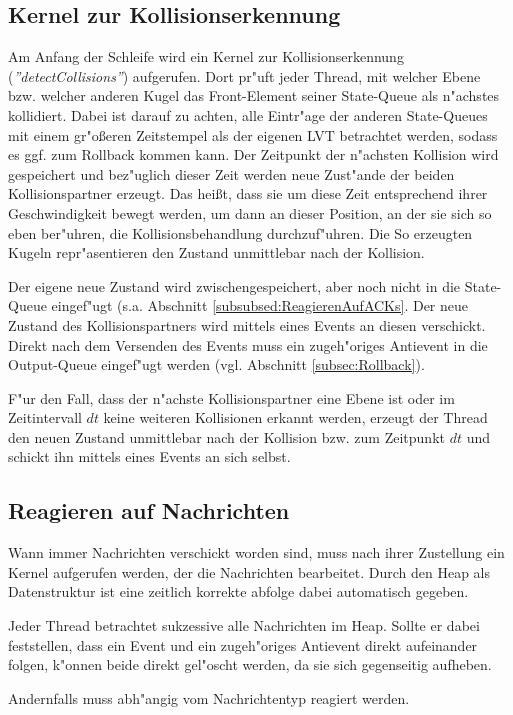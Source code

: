 \documentclass[a4paper, 10pt, openright, parskip, chapterprefix]{scrreprt}
\begin{document}
\subsection{Kernel zur Kollisionserkennung}
Am Anfang der Schleife wird ein Kernel zur Kollisionserkennung (\emph{''detectCollisions''}) aufgerufen. Dort pr"uft jeder Thread, mit welcher Ebene
bzw. welcher anderen Kugel das Front-Element seiner State-Queue als n"achstes kollidiert. Dabei ist
darauf zu achten, alle Eintr"age der anderen State-Queues mit einem
gr"o\ss eren Zeitstempel als der eigenen LVT betrachtet werden, sodass es ggf. zum Rollback kommen kann. Der Zeitpunkt der n"achsten
Kollision wird gespeichert und bez"uglich dieser Zeit werden neue Zust"ande der beiden Kollisionspartner erzeugt. Das
hei\ss t, dass sie um diese Zeit entsprechend ihrer Geschwindigkeit bewegt werden, um dann an dieser Position, an der
sie sich so eben ber"uhren, die Kollisionsbehandlung
durchzuf"uhren. Die So erzeugten Kugeln repr"asentieren den Zustand unmittlebar nach der Kollision.

Der eigene neue Zustand wird zwischengespeichert, aber noch nicht in die State-Queue eingef"ugt (s.a. Abschnitt
\ref{subsubsed:ReagierenAufACKs}. Der neue
Zustand des Kollisionspartners wird mittels eines Events an diesen verschickt. Direkt nach dem Versenden des Events muss
ein zugeh"origes Antievent in die Output-Queue eingef"ugt werden (vgl. Abschnitt \ref{subsec:Rollback}).

F"ur den Fall, dass der n"achste Kollisionspartner eine Ebene ist oder im Zeitintervall $dt$ keine weiteren Kollisionen
erkannt werden, erzeugt der Thread den neuen Zustand unmittlebar nach der Kollision bzw. zum Zeitpunkt $dt$ und schickt
ihn mittels eines Events an sich selbst.

\subsection{Reagieren auf Nachrichten}
Wann immer Nachrichten verschickt worden sind, muss nach ihrer Zustellung ein Kernel aufgerufen werden, der die
Nachrichten bearbeitet. Durch den Heap als Datenstruktur ist eine zeitlich korrekte abfolge dabei automatisch gegeben.

Jeder Thread betrachtet sukzessive alle Nachrichten im Heap. Sollte er dabei feststellen, dass ein Event und ein
zugeh"origes Antievent direkt aufeinander folgen, k"onnen beide direkt gel"oscht werden, da sie sich gegenseitig
aufheben.

Andernfalls muss abh"angig vom Nachrichtentyp reagiert werden.
\end{document}
